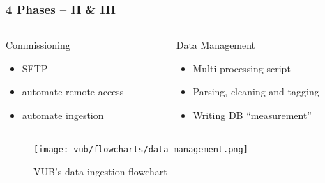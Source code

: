 \begin{frame}
    \frametitle{4 Phases -- II \& III}
    \vspace*{\fill}
    \begin{columns}[onlytextwidth, c]
        \begin{column}{.47\textwidth}
            \begin{exampleblock}{Commissioning}
                \begin{itemize}
                    \item \ac{SFTP}
                    \item automate remote access
                    \item automate ingestion
                \end{itemize}
            \end{exampleblock}
        \end{column}
        \begin{column}{.52\textwidth}
            \begin{exampleblock}{Data Management}
                \begin{itemize}
                    \item Multi processing script
                    \item Parsing, cleaning and tagging %
                    \item Writing DB ``measurement''  %
                \end{itemize}
            \end{exampleblock}
        \end{column}
    \end{columns}
    \begin{figure}[ht]
        \texttt{[image: vub/flowcharts/data-management.png]}
        \caption{\acs{VUB}'s data ingestion flowchart}
    \end{figure}
    \vspace*{\fill}
\end{frame}

